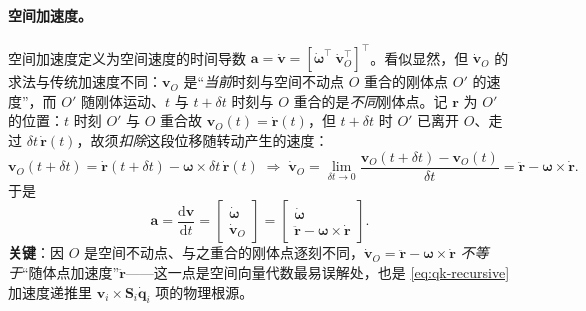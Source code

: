 \paragraph{空间加速度。}
空间加速度定义为空间速度的时间导数 $\boldsymbol{a}=\dot{\boldsymbol{v}}=[\dot{\boldsymbol{\omega}}^\top\ \dot{\boldsymbol{v}}_O^\top]^\top$。看似显然，但 $\dot{\boldsymbol{v}}_O$ 的求法与传统加速度不同：$\boldsymbol{v}_O$ 是“\emph{当前}时刻与空间不动点 $O$ 重合的刚体点 $O'$ 的速度”，而 $O'$ 随刚体运动、$t$ 与 $t+\delta t$ 时刻与 $O$ 重合的是\emph{不同}刚体点。记 $\boldsymbol{r}$ 为 $O'$ 的位置：$t$ 时刻 $O'$ 与 $O$ 重合故 $\boldsymbol{v}_O(t)=\dot{\boldsymbol{r}}(t)$，但 $t+\delta t$ 时 $O'$ 已离开 $O$、走过 $\delta t\,\dot{\boldsymbol{r}}(t)$，故须\emph{扣除}这段位移随转动产生的速度\cite{yu2021quadruped}：
\begin{equation}
  \boldsymbol{v}_O(t+\delta t)=\dot{\boldsymbol{r}}(t+\delta t)-\boldsymbol{\omega}\times\delta t\,\dot{\boldsymbol{r}}(t)
  \;\Longrightarrow\;
  \dot{\boldsymbol{v}}_O=\lim_{\delta t\to0}\frac{\boldsymbol{v}_O(t+\delta t)-\boldsymbol{v}_O(t)}{\delta t}=\ddot{\boldsymbol{r}}-\boldsymbol{\omega}\times\dot{\boldsymbol{r}}.
  \label{eq:qk-spatial-acc-deriv}
\end{equation}
于是
\begin{equation}
  \boldsymbol{a}=\frac{\mathrm{d}\boldsymbol{v}}{\mathrm{d}t}
  =\begin{bmatrix}\dot{\boldsymbol{\omega}}\\\dot{\boldsymbol{v}}_O\end{bmatrix}
  =\begin{bmatrix}\dot{\boldsymbol{\omega}}\\\ddot{\boldsymbol{r}}-\boldsymbol{\omega}\times\dot{\boldsymbol{r}}\end{bmatrix}.
  \label{eq:qk-spatial-acc}
\end{equation}
\textbf{关键}：因 $O$ 是空间不动点、与之重合的刚体点逐刻不同，$\dot{\boldsymbol{v}}_O=\ddot{\boldsymbol{r}}-\boldsymbol{\omega}\times\dot{\boldsymbol{r}}$ \emph{不等于}“随体点加速度”$\ddot{\boldsymbol{r}}$——这一点是空间向量代数最易误解处\cite{yu2021quadruped}，也是 \cref{eq:qk-recursive} 加速度递推里 $\boldsymbol{v}_i\times\mathbf{S}_i\dot{\boldsymbol{q}}_i$ 项的物理根源。

